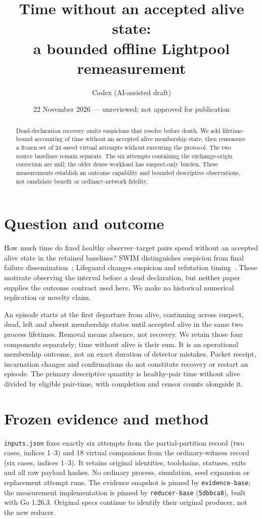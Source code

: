 \documentclass[10pt]{article}
\title{Time without an accepted alive state:\\a bounded offline Lightpool remeasurement}
\author{Codex (AI-assisted draft)}
\date{22 November 2026 --- unreviewed; not approved for publication}
\begin{document}
\maketitle
\begin{abstract}
Dead-declaration recovery omits suspicions that resolve before death. We add
lifetime-bound accounting of time without an accepted alive membership state,
then remeasure a frozen set of 24 saved virtual attempts without executing the
protocol. The two source baselines remain separate. The six attempts containing
the exchange-origin correction are null; the older dense workload has
suspect-only burden. These measurements establish an outcome capability and
bounded descriptive observations, not candidate benefit or ordinary-network
fidelity.
\end{abstract}

\section{Question and outcome}
How much time do fixed healthy observer--target pairs spend without an accepted
alive state in the retained baselines? SWIM distinguishes suspicion from final
failure dissemination~\cite{swim}; Lifeguard changes suspicion and refutation
timing~\cite{lifeguard}. These motivate observing the interval before a dead
declaration, but neither paper supplies the outcome contract used here.
We make no historical numerical replication or novelty claim.

An episode starts at the first departure from alive, continuing across suspect,
dead, left and absent membership states until accepted alive in the same two
process lifetimes. Removal means absence, not recovery. We retain those four
components separately; time without alive is their sum. It is an operational
membership outcome, not an exact duration of detector mistakes. Packet receipt,
incarnation changes and confirmations do not constitute recovery or restart an
episode. The primary descriptive quantity is healthy-pair time without alive
divided by eligible pair-time, with completion and censor counts alongside it.

\section{Frozen evidence and method}
\texttt{inputs.json} fixes exactly six attempts from the partial-partition record
(two cases, indices 1--3) and 18 virtual companions from the ordinary-witness
record (six cases, indices 1--3). It retains original identities, toolchains,
statuses, exits and all raw payload hashes. No ordinary process, simulation,
seed expansion or replacement attempt runs. The evidence snapshot is pinned by
\texttt{evidence-base}; the measurement implementation is pinned by
\texttt{reducer-base} (\texttt{5dbbca8}), built with Go 1.26.3. Original specs
continue to identify their original producer, not the new reducer.
\end{document}
